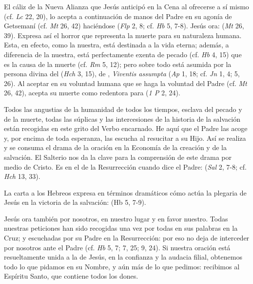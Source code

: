 \begin{ccebody}


 El cáliz de la Nueva Alianza que Jesús anticipó en la Cena al ofrecerse a sí mismo (cf. \textit{Lc} 22, 20), lo acepta a continuación de manos del Padre en su agonía de Getsemaní (cf. \textit{Mt} 26, 42) haciéndose  (\textit{Flp} 2, 8; cf. \textit{Hb} 5, 7-8). Jesús ora:  (\textit{Mt} 26, 39). Expresa así el horror que representa la muerte para su naturaleza humana. Esta, en efecto, como la nuestra, está destinada a la vida eterna; además, a diferencia de la nuestra, está perfectamente exenta de pecado (cf. \textit{Hb} 4, 15) que es la causa de la muerte (cf. \textit{Rm} 5, 12); pero sobre todo está asumida por la persona divina del  (\textit{Hch} 3, 15), de , \textit{Viventis assumpta} (\textit{Ap} 1, 18; cf. \textit{Jn} 1, 4; 5, 26). Al aceptar en su voluntad humana que se haga la voluntad del Padre (cf. \textit{Mt} 26, 42), acepta su muerte como redentora para  (\textit{1 P} 2, 24).

 Todos las angustias de la humanidad de todos los tiempos, esclava del pecado y de la muerte, todas las súplicas y las intercesiones de la historia de la salvación están recogidas en este grito del Verbo encarnado. He aquí que el Padre las acoge y, por encima de toda esperanza, las escucha al resucitar a su Hijo. Así se realiza y se consuma el drama de la oración en la Economía de la creación y de la salvación. El Salterio nos da la clave para la comprensión de este drama por medio de Cristo. Es en el  de la Resurrección cuando dice el Padre:  (\textit{Sal} 2, 7-8; cf. \textit{Hch} 13, 33).

La carta a los Hebreos expresa en términos dramáticos cómo actúa la plegaria de Jesús en la victoria de la salvación:  (Hb 5, 7-9).

 Jesús ora también por nosotros, en nuestro lugar y en favor nuestro. Todas nuestras peticiones han sido recogidas una vez por todas en sus palabras en la Cruz; y escuchadas por su Padre en la Resurrección: por eso no deja de interceder por nosotros ante el Padre (cf. \textit{Hb} 5, 7; 7, 25; 9, 24). Si nuestra oración está resueltamente unida a la de Jesús, en la confianza y la audacia filial, obtenemos todo lo que pidamos en su Nombre, y aún más de lo que pedimos: recibimos al Espíritu Santo, que contiene todos los dones.

\end{ccebody}

